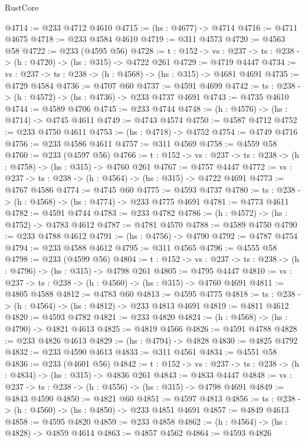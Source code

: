 \begin{lexlean}{RustCore}
\begin{coremodule}
@4714 := @233 @4712 @4610
@4715 := (hs : @4677) -> @4714
@4716 := @4711 @4675
@4718 := @233 @4584 @4610
@4719 := @311 @4573
@4720 := @4563 @58
@4722 := @233 (@4595 @56)
@4728 := {t : @152} -> {vs : @237} -> {ts : @238} -> (h : @4720) -> (hs : @315) -> @4722 @261
@4729 := @4719 @4447
@4734 := {vs : @237} -> {ts : @238} -> (h : @4568) -> (hs : @315) -> @4681 @4691
@4735 := @4729 @4584
@4736 := @4707 @60
@4737 := @4591 @4699
@4742 := {ts : @238} -> (h : @4572) -> (hs : @4736) -> @233 @4737 @4691
@4743 := @4735 @4610
@4744 := @4589 @4706
@4745 := @233 @4744
@4748 := (h : @4576) -> (hs : @4714) -> @4745 @4611
@4749 := @4743 @4574
@4750 := @4587 @4712
@4752 := @233 @4750 @4611
@4753 := (hs : @4718) -> @4752
@4754 := @4749 @4716
@4756 := @233 @4586 @4611
@4757 := @311 @4569
@4758 := @4559 @58
@4760 := @233 (@4597 @56)
@4766 := {t : @152} -> {vs : @237} -> {ts : @238} -> (h : @4758) -> (hs : @315) -> @4760 @261
@4767 := @4757 @4447
@4772 := {vs : @237} -> {ts : @238} -> (h : @4564) -> (hs : @315) -> @4722 @4691
@4773 := @4767 @4586
@4774 := @4745 @60
@4775 := @4593 @4737
@4780 := {ts : @238} -> (h : @4568) -> (hs : @4774) -> @233 @4775 @4691
@4781 := @4773 @4611
@4782 := @4591 @4744
@4783 := @233 @4782
@4786 := (h : @4572) -> (hs : @4752) -> @4783 @4612
@4787 := @4781 @4570
@4788 := @4589 @4750
@4790 := @233 @4788 @4612
@4791 := (hs : @4756) -> @4790
@4792 := @4787 @4754
@4794 := @233 @4588 @4612
@4795 := @311 @4565
@4796 := @4555 @58
@4798 := @233 (@4599 @56)
@4804 := {t : @152} -> {vs : @237} -> {ts : @238} -> (h : @4796) -> (hs : @315) -> @4798 @261
@4805 := @4795 @4447
@4810 := {vs : @237} -> {ts : @238} -> (h : @4560) -> (hs : @315) -> @4760 @4691
@4811 := @4805 @4588
@4812 := @4783 @60
@4813 := @4595 @4775
@4818 := {ts : @238} -> (h : @4564) -> (hs : @4812) -> @233 @4813 @4691
@4819 := @4811 @4612
@4820 := @4593 @4782
@4821 := @233 @4820
@4824 := (h : @4568) -> (hs : @4790) -> @4821 @4613
@4825 := @4819 @4566
@4826 := @4591 @4788
@4828 := @233 @4826 @4613
@4829 := (hs : @4794) -> @4828
@4830 := @4825 @4792
@4832 := @233 @4590 @4613
@4833 := @311 @4561
@4834 := @4551 @58
@4836 := @233 (@4601 @56)
@4842 := {t : @152} -> {vs : @237} -> {ts : @238} -> (h : @4834) -> (hs : @315) -> @4836 @261
@4843 := @4833 @4447
@4848 := {vs : @237} -> {ts : @238} -> (h : @4556) -> (hs : @315) -> @4798 @4691
@4849 := @4843 @4590
@4850 := @4821 @60
@4851 := @4597 @4813
@4856 := {ts : @238} -> (h : @4560) -> (hs : @4850) -> @233 @4851 @4691
@4857 := @4849 @4613
@4858 := @4595 @4820
@4859 := @233 @4858
@4862 := (h : @4564) -> (hs : @4828) -> @4859 @4614
@4863 := @4857 @4562
@4864 := @4593 @4826

\end{coremodule}
\end{lexlean}
